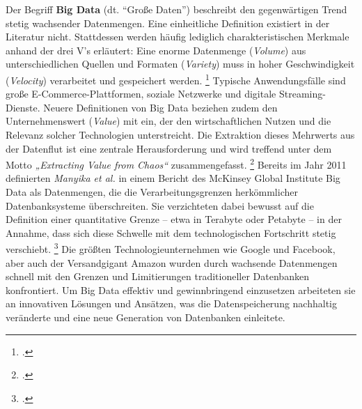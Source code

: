 Der Begriff \textbf{Big Data} (dt. \enquote{Große Daten}) beschreibt den gegenwärtigen Trend stetig wachsender Datenmengen. Eine einheitliche Definition existiert in der Literatur nicht. Stattdessen werden häufig lediglich charakteristischen Merkmale anhand der drei V's erläutert: Eine enorme Datenmenge (\emph{Volume}) aus unterschiedlichen Quellen und Formaten (\emph{Variety}) muss in hoher Geschwindigkeit (\emph{Velocity}) verarbeitet und gespeichert werden. \footcite[S. 5]{meierWerkzeugeDigitalenWirtschaft2018} Typische Anwendungsfälle sind große E-Commerce-Plattformen, soziale Netzwerke und digitale Streaming-Dienste. Neuere Definitionen von Big Data beziehen zudem den Unternehmenswert (\emph{Value}) mit ein, der den wirtschaftlichen Nutzen und die Relevanz solcher Technologien unterstreicht. Die Extraktion dieses Mehrwerts aus der Datenflut ist eine zentrale Herausforderung und wird treffend unter dem Motto \emph{„Extracting Value from Chaos“} zusammengefasst. \footcite[S. 173 ff.]{chenBigDataSurvey2014} Bereits im Jahr 2011 definierten \emph{Manyika et al.} in einem Bericht des McKinsey Global Institute Big Data als Datenmengen, die die Verarbeitungsgrenzen herkömmlicher Datenbanksysteme überschreiten. Sie verzichteten dabei bewusst auf die Definition einer quantitative Grenze – etwa in Terabyte oder Petabyte – in der Annahme, dass sich diese Schwelle mit dem technologischen Fortschritt stetig verschiebt. \footcite{manyikaBigDataNext2011} Die größten Technologieunternehmen wie Google und Facebook, aber auch der Versandgigant Amazon wurden durch wachsende Datenmengen schnell mit den Grenzen und Limitierungen traditioneller Datenbanken konfrontiert. Um Big Data effektiv und gewinnbringend einzusetzen arbeiteten sie  an innovativen Lösungen und Ansätzen, was die Datenspeicherung nachhaltig veränderte und eine neue Generation von Datenbanken einleitete.



